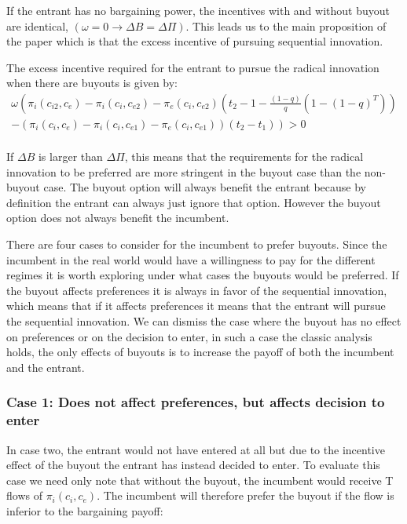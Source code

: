 If the entrant has no bargaining power, the incentives with and without buyout are identical, $(\omega=0 \rightarrow \Delta B = \Delta \Pi)$. This leads us to the main proposition of the paper which is that the excess incentive of pursuing sequential innovation. 

\begin{proposition} \label{excessincentive}
The excess incentive required for the entrant to pursue the radical innovation when there are buyouts is given by: 
\begin{align*}
\omega \left(  \pi_{i}(c_{i2},c_{e})- \pi_{i}(c_{i},c_{e2})-\pi_{e}(c_{i},c_{e2})  \left( t_2-1  - \frac{(1-q)}{q} \left( 1-(1-q)^T \right) \right) \right. \\
-\left.(\pi_i(c_i,c_{e})-\pi_i(c_i,c_{e1})-\pi_e(c_i,c_{e1}))(t_2-t_1) \right)  >0 \\
\end{align*}
\end{proposition}


If $\Delta B$ is larger than $\Delta \Pi$, this means that the requirements for the radical innovation to be preferred are more stringent in the buyout case than the non-buyout case. The buyout option will always benefit the entrant because by definition the entrant can always just ignore that option. However the buyout option does not always benefit the incumbent. 

There are four cases to consider for the incumbent to prefer buyouts. Since the incumbent in the real world would have a willingness to pay for the different regimes it is worth exploring under what cases the buyouts would be preferred. If the buyout affects preferences it is always in favor of the sequential innovation, which means that if it affects preferences it means that the entrant will pursue the sequential innovation. We can dismiss the case where the buyout has no effect on preferences or on the decision to enter, in such a case the classic analysis holds, the only effects of buyouts is to increase the payoff of both the incumbent and the entrant. \newline


\subsubsection{Case 1: Does not affect preferences, but affects decision to enter} \label{case:decision}
In case two, the entrant would not have entered at all but due to the incentive effect of the buyout the entrant has instead decided to enter. To evaluate this case we need only note that without the buyout, the incumbent would receive T flows of $\pi_i(c_i,c_e)$. The incumbent will therefore prefer the buyout if the flow is inferior to the bargaining payoff: 

